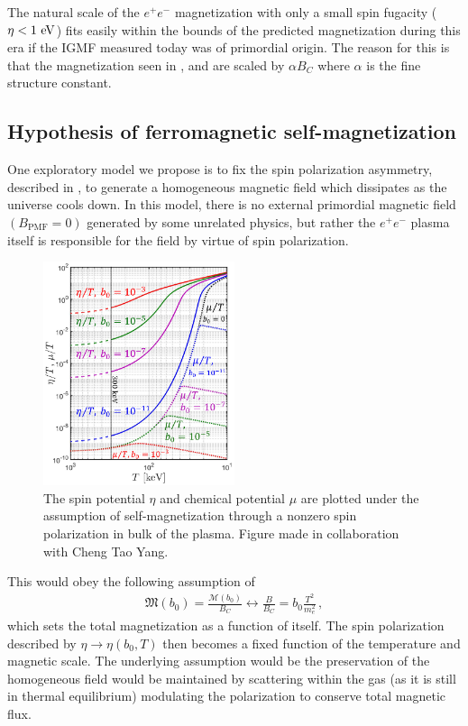 The natural scale of the $e^{+}e^{-}$ magnetization with only a small spin fugacity ($\eta<1\text{ eV}$) fits easily within the bounds of the predicted magnetization during this era if the IGMF measured today was of primordial origin. The reason for this is that the magnetization seen in ,  and  are scaled by $\alpha{B}_{C}$ where $\alpha$ is the fine structure constant.

\subsection{Hypothesis of ferromagnetic self-magnetization}
\label{sec:self}
\noindent One exploratory model we propose is to fix the spin polarization asymmetry, described in , to generate a homogeneous magnetic field which dissipates as the universe cools down. In this model, there is no external primordial magnetic field $({B}_\mathrm{PMF}=0)$ generated by some unrelated physics, but rather the $e^{+}e^{-}$ plasma itself is responsible for the field by virtue of spin polarization.

\begin{figure}[h]
 \centering
 \includegraphics[width=0.5\textwidth]{plots/chap04cosmo/Spinchemical_03.png}
 \caption{The spin potential $\eta$ and chemical potential $\mu$ are plotted under the assumption of self-magnetization through a nonzero spin polarization in bulk of the plasma. Figure made in collaboration with Cheng Tao Yang.}
 \label{fig:self} 
\end{figure}

This would obey the following assumption of
\begin{align}
 \label{selfmag}
 {\mathfrak M}(b_{0})=\frac{\mathcal{M}(b_0)}{{B}_{C}}\longleftrightarrow\frac{B}{{B}_{C}}=b_{0}\frac{T^{2}}{m_{e}^{2}}\,,
\end{align}
which sets the total magnetization as a function of itself. The spin polarization described by $\eta\rightarrow\eta(b_{0},T)$ then becomes a fixed function of the temperature and magnetic scale. The underlying assumption would be the preservation of the homogeneous field would be maintained by scattering within the gas (as it is still in thermal equilibrium) modulating the polarization to conserve total magnetic flux.

